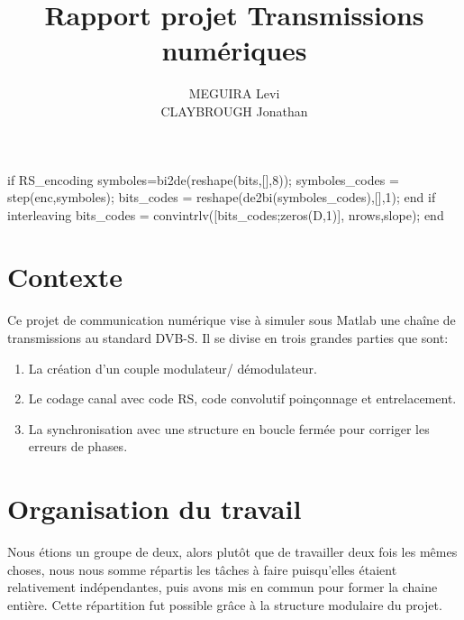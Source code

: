 \documentclass[a4paper,10pt]{article}
\title{Rapport projet Transmissions numériques}
\author{MEGUIRA Levi \\
	CLAYBROUGH Jonathan}
\begin{document}
\maketitle

\begin{comment}
	\textbf{Remarque importante: Notre chaine de transmission ne \emph{donne pas l'air} de transmettre \emph{un} signal complexe mais bien deux signaux distincts qui subissent exactement les mêmes opérations. Afin de respecter au possible le schéma de l'énoncé ainsi que le principe de ne jamais répeter de code en Matlab, il importe de créer un signal numérique \emph{réelement complexe} (sans jeu de mot) à partir des bits de départ et de transmettre un seul et même objet d'une extrémité à l'autre. \\ Le caractère universel des fonctions Matlab suffit à faire appliquer toutes les fonctions utilisés dans ce code à un vecteur complexe définie par \texttt{symboles=bitsI+j*bitsQ}}
\end{comment}

\begin{lstun}
	if RS_encoding
		symboles=bi2de(reshape(bits,[],8));
		symboles_codes = step(enc,symboles);
		bits_codes = reshape(de2bi(symboles_codes),[],1);
	end
	if interleaving
		bits_codes = convintrlv([bits_codes;zeros(D,1)], nrows,slope);
	end

\end{lstun}


\section*{Contexte}
Ce projet de communication numérique vise à simuler sous Matlab une chaîne de transmissions au standard DVB-S. Il se divise en trois grandes parties que sont:
\begin{enumerate}
	\item La création d'un couple modulateur/ démodulateur.
	\item Le codage canal avec code RS, code convolutif poinçonnage et entrelacement.
	\item La synchronisation avec une structure en boucle fermée pour corriger les erreurs de phases.
\end{enumerate}

\tableofcontents

\section{Organisation du travail}
Nous étions un groupe de deux, alors plutôt que de travailler deux fois les mêmes choses, nous nous somme répartis les tâches à faire puisqu'elles étaient relativement indépendantes, puis avons mis en commun pour former la chaine entière. 
\newline
Cette répartition fut possible grâce à la structure modulaire du projet. 
\end{document}
